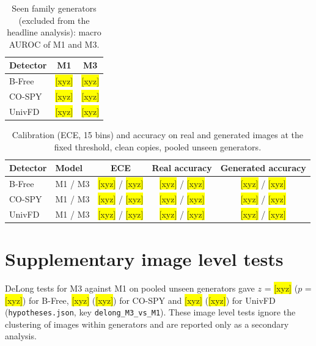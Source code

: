 \documentclass[11pt,a4paper]{article}
\newcommand{\xyz}[1][]{\colorbox{yellow}{[xyz]}}
\begin{document}
\begin{table}[h]
\centering
\caption{Seen family generators (excluded from the headline analysis): macro AUROC of M1 and M3.}
\small
\begin{tabular}{@{}lcc@{}}
\toprule
Detector & M1 & M3 \\
\midrule
B-Free & \xyz[seen.bfree.M1] & \xyz[seen.bfree.M3] \\
CO-SPY & \xyz[seen.cospy.M1] & \xyz[seen.cospy.M3] \\
UnivFD & \xyz[seen.univfd.M1] & \xyz[seen.univfd.M3] \\
\bottomrule
\end{tabular}
\end{table}

\begin{table}[h]
\centering
\caption{Calibration (ECE, 15 bins) and accuracy on real and generated images at the fixed threshold, clean copies, pooled unseen generators.}
\small
\begin{tabular}{@{}llccc@{}}
\toprule
Detector & Model & ECE & Real accuracy & Generated accuracy \\
\midrule
B-Free & M1 / M3 & \xyz[calib.bfree.ece.M1]{} / \xyz[calib.bfree.ece.M3] & \xyz[calib.bfree.acc_real.M1]{} / \xyz[calib.bfree.acc_real.M3] & \xyz[calib.bfree.acc_fake.M1]{} / \xyz[calib.bfree.acc_fake.M3] \\
CO-SPY & M1 / M3 & \xyz[calib.cospy.ece.M1]{} / \xyz[calib.cospy.ece.M3] & \xyz[calib.cospy.acc_real.M1]{} / \xyz[calib.cospy.acc_real.M3] & \xyz[calib.cospy.acc_fake.M1]{} / \xyz[calib.cospy.acc_fake.M3] \\
UnivFD & M1 / M3 & \xyz[calib.univfd.ece.M1]{} / \xyz[calib.univfd.ece.M3] & \xyz[calib.univfd.acc_real.M1]{} / \xyz[calib.univfd.acc_real.M3] & \xyz[calib.univfd.acc_fake.M1]{} / \xyz[calib.univfd.acc_fake.M3] \\
\bottomrule
\end{tabular}
\end{table}

\section{Supplementary image level tests}

DeLong tests for M3 against M1 on pooled unseen generators gave $z$ = \xyz[delong.bfree.z]{} ($p$ = \xyz[delong.bfree.p]) for B-Free, \xyz[delong.cospy.z]{} (\xyz[delong.cospy.p]) for CO-SPY and \xyz[delong.univfd.z]{} (\xyz[delong.univfd.p]) for UnivFD (\texttt{hypotheses.json}, key \texttt{delong\_M3\_vs\_M1}). These image level tests ignore the clustering of images within generators and are reported only as a secondary analysis.
\end{document}
